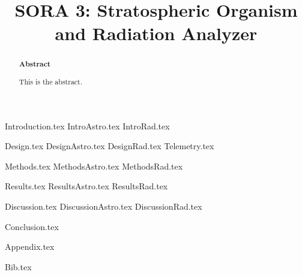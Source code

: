 \documentclass[aps,superscriptaddress,floatfix,nofootinbib,showpacs,amsmath,amssymb,altaffilletter,floatfix,onecolumn]{revtex4-1}
\begin{document}
\title{SORA 3: Stratospheric Organism and Radiation Analyzer}

\begin{abstract}
\begin{center}
{\bf Abstract}
\end{center}
\frenchspacing

This is the abstract.

\newpage %
\end{abstract}

\setlength{\parindent}{1em}
\setdefaultleftmargin{1em}{1em}{}{}{}{}
\setcounter{page}{0}\thispagestyle{empty}
\maketitle
\onecolumngrid
\setcounter{tocdepth}{2}
\setcounter{page}{0}\thispagestyle{empty}
\tableofcontents
\setcounter{page}{0}\thispagestyle{empty}
\newpage
\onecolumngrid

{Introduction.tex}
{IntroAstro.tex}
{IntroRad.tex}

{Design.tex}
{DesignAstro.tex}
{DesignRad.tex}
{Telemetry.tex}

{Methods.tex}
{MethodsAstro.tex}
{MethodsRad.tex}

{Results.tex} 
{ResultsAstro.tex} 
{ResultsRad.tex} 

{Discussion.tex}
{DiscussionAstro.tex}
{DiscussionRad.tex}

{Conclusion.tex} 
\newpage

{Appendix.tex}
\newpage

{Bib.tex}

\clearpage

\end{document}

